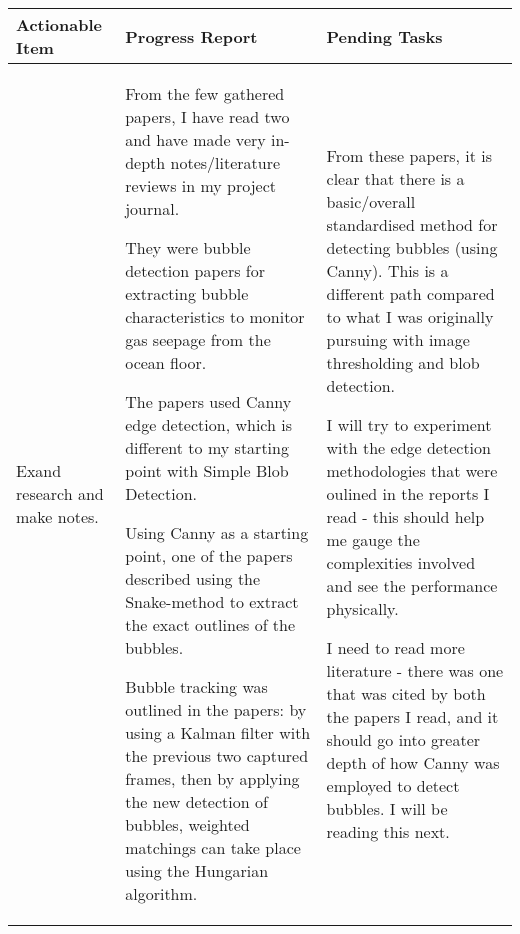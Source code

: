 \begin{table}[!h]
    \centering
    \begin{tabularx}{\textwidth}{|X|X|X|}
        \hline
        Actionable Item & Progress Report & Pending Tasks \\
        \hline
        \hline
        \begin{myitemize}
            \item Exand research and make notes.
        \end{myitemize} & 
        \begin{myitemize}
            \item From the few gathered papers, I have read two and have made very in-depth notes/literature reviews in my project journal.
            \item They were bubble detection papers for extracting bubble characteristics to monitor gas seepage from the ocean floor.
            \item The papers used Canny edge detection, which is different to my starting point with Simple Blob Detection.
            \item Using Canny as a starting point, one of the papers described using the Snake-method to extract the exact outlines of the bubbles.
            \item Bubble tracking was outlined in the papers: by using a Kalman filter with the previous two captured frames, then by applying the new detection of bubbles, weighted matchings can take place using the Hungarian algorithm.
        \end{myitemize} & 
        \begin{myitemize}
            \item From these papers, it is clear that there is a basic/overall standardised method for detecting bubbles (using Canny). This is a different path compared to what I was originally pursuing with image thresholding and blob detection.
            \item I will try to experiment with the edge detection methodologies that were oulined in the reports I read - this should help me gauge the complexities involved and see the performance physically.
            \item I need to read more literature - there was one that was cited by both the papers I read, and it should go into greater depth of how Canny was employed to detect bubbles. I will be reading this next.
        \end{myitemize} \\

\end{tabularx}
\end{table}
